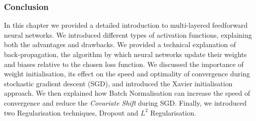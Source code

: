 \subsubsection{Conclusion}
    In this chapter we provided a detailed introduction to multi-layered feedforward neural networks. We introduced different types of activation functions, explaining both the advantages and drawbacks. We provided a technical explanation of back-propagation, the algorithm by which neural networks update their weights and biases relative to the chosen loss function. We discussed the importance of weight initialisation, its effect on the speed and optimality of convergence during stochastic gradient descent (SGD), and introduced the Xavier initialisation approach. We then explained how Batch Normalisation can increase the speed of convergence and reduce the \textit{Covariate Shift} during SGD. Finally, we introduced two Regularisation techniques, Dropout and $L^2$ Regularisation.



